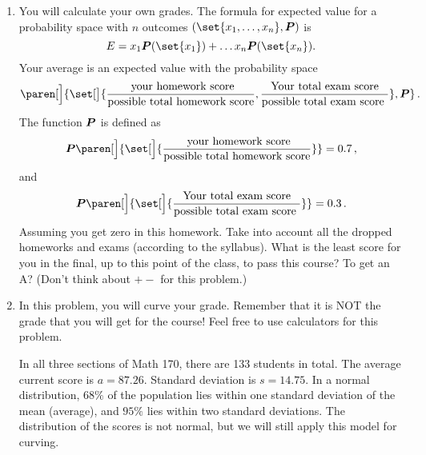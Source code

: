 \documentclass[12pt]{amsart}
\begin{document}
\begin{enumerate}[label=\arabic*.,itemsep=10pt, leftmargin=*]
    \item You will calculate your own grades.
       The formula for expected value for a probability space with $n$ outcomes
       $(\set{x_1, \dots, x_n}, \P)$ is
        \begin{equation*}
            E = x_1 \P(\set{x_1}) + \dots x_n \P(\set{x_n}).
        \end{equation*}
        Your average is an expected value with the probability space
        $$\paren[\Big]{\set[\big]{\frac{\text{ your homework score}}{\text{possible total homework score}}, 
                \frac{\text{Your total exam score}}{\text{possible total exam score }}}, \P} \,.$$
                The function $\P$ is defined as 
                \begin{equation*}
                    \P\paren[\Big]{ \set[\Big]{\frac{\text{ your homework score}}{\text{possible total homework score}} } }= 0.7 \,,
                \end{equation*}
                and 
                \begin{equation*}
                   \P \paren[\Big]{\set[\Big]{  \frac{\text{Your total exam score}}{\text{possible total exam score }} }}  = 0.3 \,.
                \end{equation*}
                Assuming you get zero in this homework.
                Take into account all the dropped homeworks and exams (according to the syllabus). 
                What is the least score for you in the final, up to this point of the class, to pass this course? To get an A? (Don't think about $+-$ for this problem.)
                
                
                
                
\item 
In this problem, you will curve your grade. Remember that it is NOT the grade that you will get for the course! Feel free to use calculators for this problem.

In all three sections of Math 170, there are 133 students in total. The average current score is $a = 87.26$. Standard deviation is $s = 14.75$. In a normal distribution, $68\%$ of the population lies within one standard deviation of the mean (average), and $95\%$ lies within two standard deviations. The distribution of the scores is not normal, but we will still apply this model for curving.


\end{enumerate}
\end{document}
